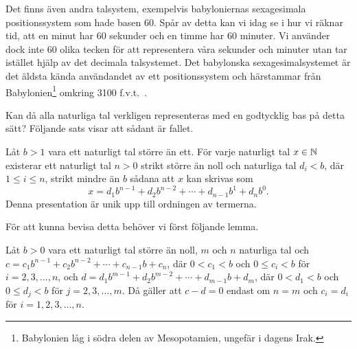 Det finns även andra talsystem, exempelvis babyloniernas
sexagesimala positionssystem%
som hade basen \(60\).
Spår av detta kan vi idag se i hur vi räknar tid, att en minut har 60
sekunder och en timme har 60 minuter.
Vi använder dock inte 60 olika tecken för att representera våra sekunder och
minuter utan tar istället hjälp av det decimala talsystemet.
Det babylonska sexagesimalsystemet är det äldsta kända användandet av ett
positionssystem och härstammar från Babylonien\footnote{Babylonien låg i
södra delen av Mesopotamien, ungefär i dagens Irak.} omkring 3100 
f.v.t.~\cite{Kline1990mtf1}.

Kan då alla naturliga tal verkligen representeras med en godtycklig bas på
detta sätt?
Följande sats visar att sådant är fallet.
\begin{theorem}\label{thm:PositionssystemAllaUnika}
  Låt \(b>1\) vara ett naturligt tal större än ett.
  För varje naturligt tal \(x\in\mathbb{N}\) existerar ett naturligt tal \(n>0\)
  strikt större än noll och naturliga tal \(d_i<b\), där \(1\leq i\leq n\),
  strikt mindre än \(b\) sådana att \(x\) kan skrivas som
  \begin{equation*}
    x = d_1 b^{n-1} + d_2 b^{n-2} + \cdots + d_{n-1} b^1 + d_n b^0.
  \end{equation*}
  Denna presentation är unik upp till ordningen av termerna.
\end{theorem}
För att kunna bevisa detta behöver vi först följande lemma.
\begin{lemma}\label{lem:NollEndastOmLika}
  Låt \(b>0\) vara ett naturligt tal större än noll, \(m\) och \(n\)
  naturliga tal och \(c=c_1b^{n-1}+c_2b^{n-2}+\cdots+c_{n-1}b+c_n\), där
  \(0<c_1<b\) och \(0\leq c_i<b\) för \(i=2,3,\ldots,n\), och
  \(d=d_1b^{m-1}+d_2b^{m-2}+\cdots+d_{m-1}b+d_m\), där \(0<d_1<b\) och \(0\leq
  d_j<b\) för \(j=2,3,\ldots,m\).
  Då gäller att \(c-d=0\) endast om \(n=m\) och \(c_i=d_i\) för
  \(i=1,2,3,\ldots,n\).
\end{lemma}
